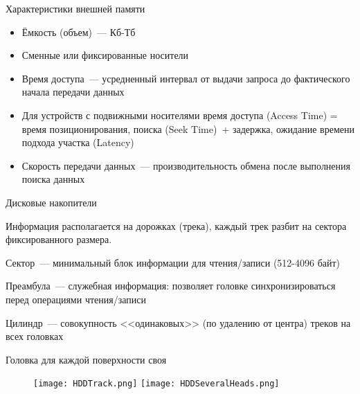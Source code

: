 \documentclass[aspectratio=169,14pt]{beamer}
\begin{document}
\begin{frame}{Характеристики внешней памяти}
    \begin{itemize}
        \item Ёмкость (объем)~--- Кб-Тб
        \item Сменные или фиксированные носители
        \item Время доступа~--- усредненный интервал от выдачи запроса до
        фактического начала передачи данных
        \item Для устройств с подвижными носителями время доступа
        (Access Time) = время позиционирования, поиска (Seek Time)~+
        задержка, ожидание времени подхода участка (Latency)
        \item Скорость передачи данных~--- производительность обмена
        после выполнения поиска данных
    \end{itemize}
\end{frame}

\begin{frame}{Дисковые накопители}
    \begin{itemize}
        \begin{footnotesize}
            \item Информация располагается на дорожках (трека), каждый трек
            разбит на сектора фиксированного размера.
            \item Сектор~--- минимальный блок информации для чтения/записи
            (512-4096 байт)
            \item Преамбула~--- служебная информация: позволяет головке
            синхронизироваться перед операциями чтения/записи
            \item Цилиндр~--- совокупность <<одинаковых>> (по удалению
            от центра) треков на всех головках
            \item Головка для каждой поверхности своя
        \end{footnotesize}
    \end{itemize}
    \begin{figure}
        \centering
        \texttt{[image: HDDTrack.png]}
        \texttt{[image: HDDSeveralHeads.png]}
    \end{figure}
\end{frame}
\end{document}
